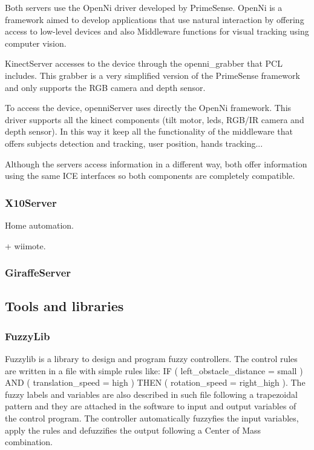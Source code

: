\documentclass[twocolumn]{svjour3}          %
\begin{document}
Both servers use the OpenNi driver developed by PrimeSense. OpenNi is a framework aimed to develop applications that use natural interaction by offering access to low-level devices and also Middleware functions for visual tracking using computer vision. 

KinectServer accesses to the device through the openni\_grabber that PCL includes. This grabber is a very simplified version of the PrimeSense framework and only supports the RGB camera and depth sensor.

To access the device, openniServer uses directly the OpenNi framework. This driver supports all the kinect components (tilt motor, leds, RGB/IR camera and depth sensor). In this way it keep all the functionality of the middleware that offers subjects detection and tracking, user position, hands tracking...

Although the servers access information in a different way, both offer information using the same ICE interfaces so both components are completely compatible. 

\subsubsection{X10Server}

Home automation.

+ wiimote.

\subsubsection{GiraffeServer}

\subsection{Tools and libraries}

\subsubsection{FuzzyLib}

Fuzzylib is a library to design and program fuzzy controllers. The control rules are written in a file with simple rules like: IF ( left\_obstacle\_distance = small ) AND ( translation\_speed = high ) THEN ( rotation\_speed = right\_high ). 
The fuzzy labels and variables are also described in such file following a trapezoidal pattern and they are attached in the software to input and output variables of the control program. The controller automatically fuzzyfies the input variables, apply the rules and defuzzifies the output following a Center of Mass combination.
\end{document}
